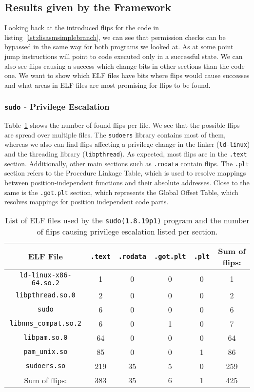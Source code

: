\subsection{Results given by the Framework}

Looking back at the introduced flips for the code in
listing~\ref{lst:disasmsimplebranch}, we can see that permission checks can be
bypassed in the same way for both programs we looked at. As at some point jump
instructions will point to code executed only in a successful state. We can also
see flips causing a success which change bits in other sections than the code
one. We want to show which ELF files have bits where flips would cause
successes and what areas in ELF files are most promising for flips to be found.

\subsubsection{\texttt{sudo} - Privilege Escalation}

Table~\ref{tab:sudores} shows the number of found flips per file. We see that
the possible flips are spread over multiple files.  The \texttt{sudoers} library
contains most of them, whereas we also can find flips affecting a privilege
change in the linker (\texttt{ld-linux}) and the threading library
(\texttt{libpthread}). As expected, most flips are in the \texttt{.text}
section. Additionally, other main sections such as \texttt{.rodata} contain
flips. The \texttt{.plt} section refers to the Procedure Linkage Table, which is
used to resolve mappings between position-independent functions and their
absolute addresses. Close to the same is the \texttt{.got.plt} section, which
represents the Global Offset Table, which resolves mappings for position
independent code parts.

\begin{table}[]
\begin{tabular}{c|cccc|c}
ELF File & \texttt{.text}  & \texttt{.rodata} & \texttt{.got.plt} &
\texttt{.plt} & Sum of flips:                             \\ \hline
\texttt{ld-linux-x86-64.so.2} & 1   & 0  & 0  & 0  & 1    \\
\texttt{libpthread.so.0}      & 2   & 0  & 0  & 0  & 2    \\
\texttt{sudo}                 & 6   & 0  & 0  & 0  & 6    \\
\texttt{libnns\_compat.so.2}  & 6   & 0  & 1  & 0  & 7    \\
\texttt{libpam.so.0}          & 64  & 0  & 0  & 0  & 64   \\
\texttt{pam\_unix.so}         & 85  & 0  & 0  & 1  & 86   \\
\texttt{sudoers.so}           & 219 & 35 & 5  & 0  & 259  \\ \hline
Sum of flips:                 & 383 & 35 & 6  & 1  & 425
\end{tabular}
\caption{List of ELF files used by the \texttt{sudo(1.8.19p1)} program and the
number of flips causing privilege escalation listed per section.}
\label{tab:sudores}
\end{table}

